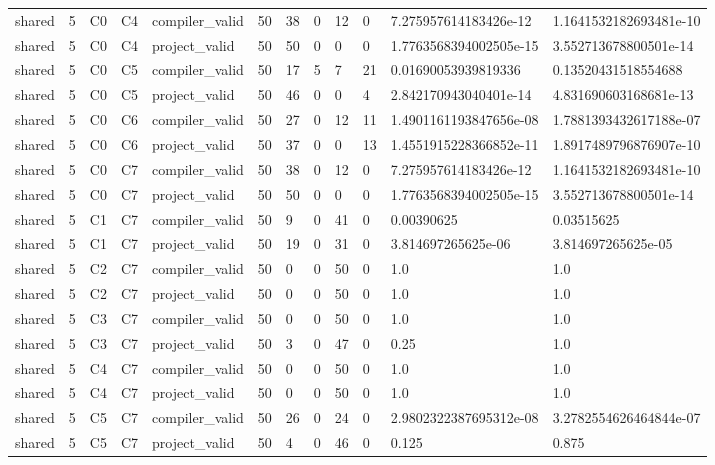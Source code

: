 \begin{tabular}{llllllllllll}
shared & 5 & C0 & C4 & compiler\_valid & 50 & 38 & 0 & 12 & 0 & 7.275957614183426e-12 & 1.1641532182693481e-10 \\
shared & 5 & C0 & C4 & project\_valid & 50 & 50 & 0 & 0 & 0 & 1.7763568394002505e-15 & 3.552713678800501e-14 \\
shared & 5 & C0 & C5 & compiler\_valid & 50 & 17 & 5 & 7 & 21 & 0.01690053939819336 & 0.13520431518554688 \\
shared & 5 & C0 & C5 & project\_valid & 50 & 46 & 0 & 0 & 4 & 2.842170943040401e-14 & 4.831690603168681e-13 \\
shared & 5 & C0 & C6 & compiler\_valid & 50 & 27 & 0 & 12 & 11 & 1.4901161193847656e-08 & 1.7881393432617188e-07 \\
shared & 5 & C0 & C6 & project\_valid & 50 & 37 & 0 & 0 & 13 & 1.4551915228366852e-11 & 1.8917489796876907e-10 \\
shared & 5 & C0 & C7 & compiler\_valid & 50 & 38 & 0 & 12 & 0 & 7.275957614183426e-12 & 1.1641532182693481e-10 \\
shared & 5 & C0 & C7 & project\_valid & 50 & 50 & 0 & 0 & 0 & 1.7763568394002505e-15 & 3.552713678800501e-14 \\
shared & 5 & C1 & C7 & compiler\_valid & 50 & 9 & 0 & 41 & 0 & 0.00390625 & 0.03515625 \\
shared & 5 & C1 & C7 & project\_valid & 50 & 19 & 0 & 31 & 0 & 3.814697265625e-06 & 3.814697265625e-05 \\
shared & 5 & C2 & C7 & compiler\_valid & 50 & 0 & 0 & 50 & 0 & 1.0 & 1.0 \\
shared & 5 & C2 & C7 & project\_valid & 50 & 0 & 0 & 50 & 0 & 1.0 & 1.0 \\
shared & 5 & C3 & C7 & compiler\_valid & 50 & 0 & 0 & 50 & 0 & 1.0 & 1.0 \\
shared & 5 & C3 & C7 & project\_valid & 50 & 3 & 0 & 47 & 0 & 0.25 & 1.0 \\
shared & 5 & C4 & C7 & compiler\_valid & 50 & 0 & 0 & 50 & 0 & 1.0 & 1.0 \\
shared & 5 & C4 & C7 & project\_valid & 50 & 0 & 0 & 50 & 0 & 1.0 & 1.0 \\
shared & 5 & C5 & C7 & compiler\_valid & 50 & 26 & 0 & 24 & 0 & 2.9802322387695312e-08 & 3.2782554626464844e-07 \\
shared & 5 & C5 & C7 & project\_valid & 50 & 4 & 0 & 46 & 0 & 0.125 & 0.875 \\
\end{tabular}